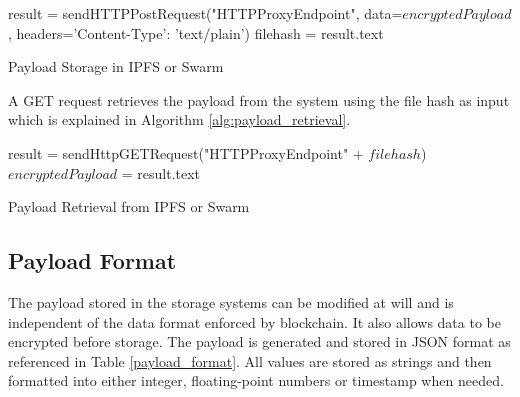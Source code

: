 \documentclass[11pt,openright]{report}
\begin{document}
\begin{algorithm}[setSwarmOrIPFSData]
  result = sendHTTPPostRequest("HTTPProxyEndpoint", data=$encryptedPayload$, headers={'Content-Type': 'text/plain'})\;
  filehash = result.text\;
 \caption{Payload Storage in IPFS or Swarm}
 \label{alg:payload_storage}
\end{algorithm}

A GET request retrieves the payload from the system using the file hash as input which is explained in Algorithm \ref{alg:payload_retrieval}.

\begin{algorithm}[getSwarmOrIPFSData]
  result = sendHttpGETRequest("HTTPProxyEndpoint" + $filehash$)\;
  $encryptedPayload$ = result.text\;
 \caption{Payload Retrieval from IPFS or Swarm}
 \label{alg:payload_retrieval}
\end{algorithm}

\subsection{Payload Format} \label{ss:payload_format}
The payload stored in the storage systems can be modified at will and is independent of the data format enforced by blockchain. It also allows data to be encrypted before storage. The payload is generated and stored in JSON format as referenced in Table \ref{payload_format}. All values are stored as strings and then formatted into either integer, floating-point numbers or timestamp when needed.
\end{document}
